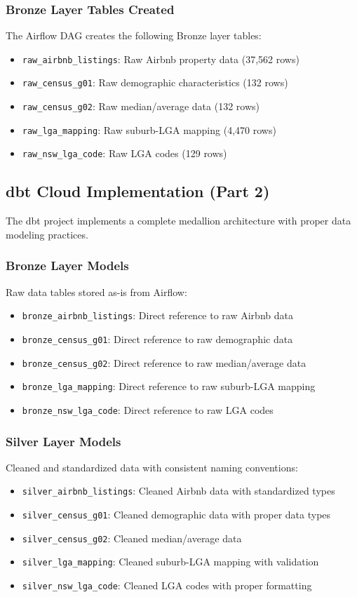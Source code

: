 \subsubsection{Bronze Layer Tables Created}
The Airflow DAG creates the following Bronze layer tables:
\begin{itemize}
  \item \texttt{raw\_airbnb\_listings}: Raw Airbnb property data (37,562 rows)
  \item \texttt{raw\_census\_g01}: Raw demographic characteristics (132 rows)
  \item \texttt{raw\_census\_g02}: Raw median/average data (132 rows)
  \item \texttt{raw\_lga\_mapping}: Raw suburb-LGA mapping (4,470 rows)
  \item \texttt{raw\_nsw\_lga\_code}: Raw LGA codes (129 rows)
\end{itemize}

\subsection{dbt Cloud Implementation (Part 2)}
The dbt project implements a complete medallion architecture with proper data modeling practices.

\subsubsection{Bronze Layer Models}
Raw data tables stored as-is from Airflow:
\begin{itemize}
  \item \texttt{bronze\_airbnb\_listings}: Direct reference to raw Airbnb data
  \item \texttt{bronze\_census\_g01}: Direct reference to raw demographic data
  \item \texttt{bronze\_census\_g02}: Direct reference to raw median/average data
  \item \texttt{bronze\_lga\_mapping}: Direct reference to raw suburb-LGA mapping
  \item \texttt{bronze\_nsw\_lga\_code}: Direct reference to raw LGA codes
\end{itemize}

\subsubsection{Silver Layer Models}
Cleaned and standardized data with consistent naming conventions:
\begin{itemize}
  \item \texttt{silver\_airbnb\_listings}: Cleaned Airbnb data with standardized types
  \item \texttt{silver\_census\_g01}: Cleaned demographic data with proper data types
  \item \texttt{silver\_census\_g02}: Cleaned median/average data
  \item \texttt{silver\_lga\_mapping}: Cleaned suburb-LGA mapping with validation
  \item \texttt{silver\_nsw\_lga\_code}: Cleaned LGA codes with proper formatting
\end{itemize}

